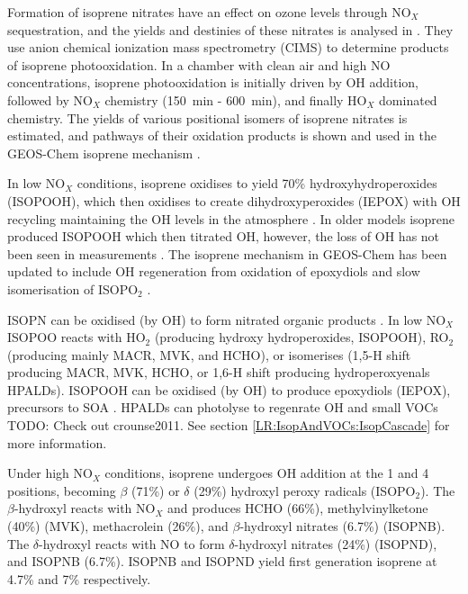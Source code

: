     Formation of isoprene nitrates have an effect on ozone levels through NO$_X$ sequestration, and the yields and destinies of these nitrates is analysed in \citet{Paulot2009a}. 
    They use anion chemical ionization mass spectrometry (CIMS) to determine products of isoprene photooxidation.
    In a chamber with clean air and high NO concentrations, isoprene photooxidation is initially driven by OH addition, followed by NO$_X$ chemistry (150~min - 600~min), and finally HO$_X$ dominated chemistry.
    The yields of various positional isomers of isoprene nitrates is estimated, and pathways of their oxidation products is shown and used in the GEOS-Chem isoprene mechanism \citep{Paulot2009a,Mao2013}. 
    
    In low NO$_X$ conditions, isoprene oxidises to yield 70\% hydroxyhydroperoxides (ISOPOOH), which then oxidises to create dihydroxyperoxides (IEPOX) with OH recycling maintaining the OH levels in the atmosphere \citep{Paulot2009b}.
    In older models isoprene produced ISOPOOH which then titrated OH, however, the loss of OH has not been seen in measurements \citep{Paulot2009b,Mao2013}.
    The isoprene mechanism in GEOS-Chem has been updated to include OH regeneration from oxidation of epoxydiols and slow isomerisation of ISOPO$_2$ \citep{Mao2013}.
    
    ISOPN can be oxidised (by OH) to form nitrated organic products \citep{Paulot2009a}.
    In low NO$_X$ ISOPOO reacts with HO$_2$ (producing hydroxy hydroperoxides, ISOPOOH), RO$_2$ (producing mainly MACR, MVK, and HCHO), or isomerises (1,5-H shift producing MACR, MVK, HCHO, or 1,6-H shift producing hydroperoxyenals HPALDs). 
    ISOPOOH can be oxidised (by OH) to produce epoxydiols (IEPOX), precursors to SOA \citep{Paulot2009b}. 
    HPALDs can photolyse to regenrate OH and small VOCs \citep{Crounse2011,Wolfe2012, Peeters2014} TODO: Check out crounse2011.
    See section \ref{LR:IsopAndVOCs:IsopCascade} for more information.
    
    Under high NO$_X$ conditions, isoprene undergoes OH addition at the 1 and 4 positions, becoming $\beta$ (71\%) or $\delta$ (29\%) hydroxyl peroxy radicals (ISOPO$_2$). 
    The $\beta$-hydroxyl reacts with NO$_X$ and produces HCHO (66\%), methylvinylketone (40\%) (MVK), methacrolein (26\%), and $\beta$-hydroxyl nitrates (6.7\%) (ISOPNB).
    The $\delta$-hydroxyl reacts with NO to form $\delta$-hydroxyl nitrates (24\%) (ISOPND), and ISOPNB (6.7\%).
    ISOPNB and ISOPND yield first generation isoprene at 4.7\% and 7\% respectively.
    
